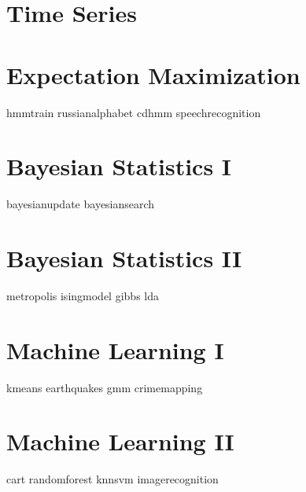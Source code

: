 \documentclass[nociteref]{SIAM-GH-book}
\begin{document}
\part{Time Series}

\part{Expectation Maximization}
{hmmtrain}
{russianalphabet}
{cdhmm}
{speechrecognition}

\part{Bayesian Statistics I}
{bayesianupdate}
{bayesiansearch}

\part{Bayesian Statistics II}
{metropolis}
{isingmodel}
{gibbs}
{lda}

\part{Machine Learning I}
{kmeans}
{earthquakes}
{gmm}
{crimemapping}

\part{Machine Learning II}
{cart}
{randomforest}
{knnsvm}
{imagerecognition}
\end{document}
